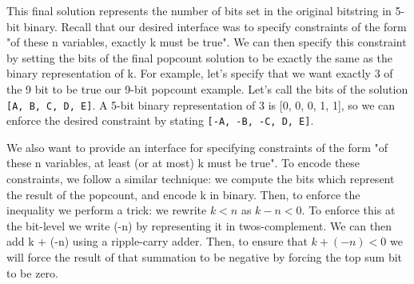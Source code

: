 This final solution represents the number of bits set in the original bitstring in 5-bit binary. Recall that our desired interface was to specify constraints of the form "of these n variables, exactly k must be true". We can then specify this constraint by setting the bits of the final popcount solution to be exactly the same as the binary representation of k. For example, let's specify that we want exactly 3 of the 9 bit to be true our 9-bit popcount example. Let's call the bits of the solution \texttt{[A, B, C, D, E]}. A 5-bit binary representation of 3 is [0, 0, 0, 1, 1], so we can enforce the desired constraint by stating \texttt{[-A, -B, -C, D, E]}.

We also want to provide an interface for specifying constraints of the form "of these n variables, at least (or at most) k must be true". To encode these constraints, we follow a similar technique: we compute the bits which represent the result of the popcount, and encode k in binary. Then, to enforce the inequality we perform a trick: we rewrite $ k < n $ as $ k - n < 0$. To enforce this at the bit-level we write (-n) by representing it in twos-complement. We can then add k + (-n) using a ripple-carry adder. Then, to ensure that $k + (-n) < 0$ we will force the result of that summation to be negative by forcing the top sum bit to be zero.
